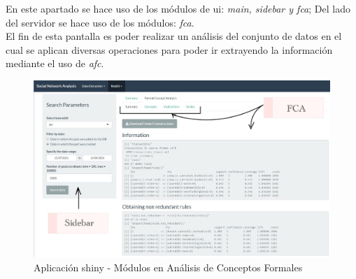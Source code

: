 \documentclass[../../main.tex]{subfiles}
\begin{document}
En este apartado se hace uso de los módulos de \gls{ui}: \textit{main, sidebar y fca}; Del lado del servidor se hace uso de los módulos: \textit{fca}.  \\
El fin de esta pantalla es poder realizar un análisis del conjunto de datos en el cual se aplican diversas operaciones para poder ir extrayendo la información mediante el uso de \textit{\gls{afc}}.

\begin{figure}[H]
\centering
\includegraphics[width=400pt]{images/implementacion/app-4.jpg}
\caption{Aplicación \Gls{shiny} - Módulos en Análisis de Conceptos Formales}
\end{figure}
        
\end{document}
